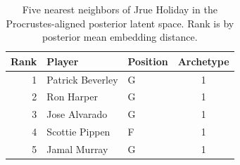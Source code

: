 \begin{table}[htbp]
  \centering\small
  \begin{tabular}{rllc}
    \toprule
    Rank & Player & Position & Archetype \\
    \midrule
    1 & Patrick Beverley & G & 1 \\
    2 & Ron Harper & G & 1 \\
    3 & Jose Alvarado & G & 1 \\
    4 & Scottie Pippen & F & 1 \\
    5 & Jamal Murray & G & 1 \\
    \bottomrule
  \end{tabular}
  \caption{Five nearest neighbors of Jrue Holiday in the Procrustes-aligned posterior latent space. Rank is by posterior mean embedding distance.}
  \label{tab:Jrue_Holiday_neighbors}
\end{table}

